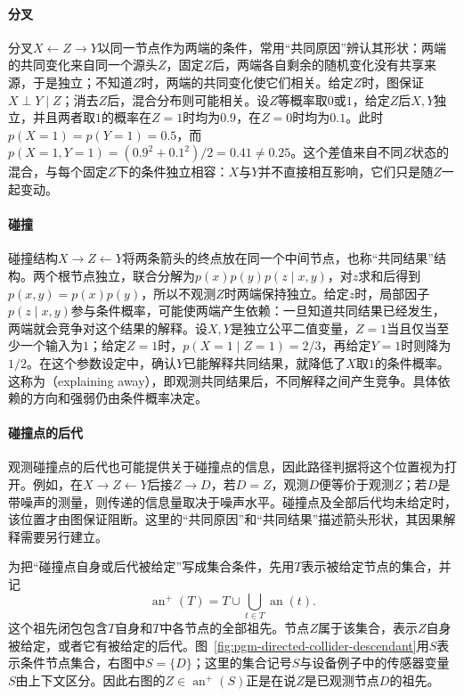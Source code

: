 \paragraph{分叉}
分叉$X\leftarrow Z\to Y$以同一节点作为两端的条件，常用“共同原因”辨认其形状：两端的共同变化来自同一个源头$Z$，固定$Z$后，两端各自剩余的随机变化没有共享来源，于是独立；不知道$Z$时，两端的共同变化使它们相关。给定$Z$时，图保证$X\perp Y\mid Z$；消去$Z$后，混合分布则可能相关。设$Z$等概率取$0$或$1$，给定$Z$后$X,Y$独立，并且两者取$1$的概率在$Z=1$时均为$0.9$，在$Z=0$时均为$0.1$。此时$p(X=1)=p(Y=1)=0.5$，而$p(X=1,Y=1)=(0.9^2+0.1^2)/2=0.41\ne0.25$。这个差值来自不同$Z$状态的混合，与每个固定$Z$下的条件独立相容：$X$与$Y$并不直接相互影响，它们只是随$Z$一起变动。

\paragraph{碰撞}
碰撞结构$X\to Z\leftarrow Y$将两条箭头的终点放在同一个中间节点，也称“共同结果”结构。两个根节点独立，联合分解为$p(x)p(y)p(z\mid x,y)$，对$z$求和后得到$p(x,y)=p(x)p(y)$，所以不观测$Z$时两端保持独立。给定$z$时，局部因子$p(z\mid x,y)$参与条件概率，可能使两端产生依赖：一旦知道共同结果已经发生，两端就会竞争对这个结果的解释。设$X,Y$是独立公平二值变量，$Z=1$当且仅当至少一个输入为$1$；给定$Z=1$时，$p(X=1\mid Z=1)=2/3$，再给定$Y=1$时则降为$1/2$。在这个参数设定中，确认$Y$已能解释共同结果，就降低了$X$取$1$的条件概率。这称为（explaining away），即观测共同结果后，不同解释之间产生竞争。具体依赖的方向和强弱仍由条件概率决定。

\paragraph{碰撞点的后代}
观测碰撞点的后代也可能提供关于碰撞点的信息，因此路径判据将这个位置视为打开。例如，在$X\to Z\leftarrow Y$后接$Z\to D$，若$D=Z$，观测$D$便等价于观测$Z$；若$D$是带噪声的测量，则传递的信息量取决于噪声水平。碰撞点及全部后代均未给定时，该位置才由图保证阻断。这里的“共同原因”和“共同结果”描述箭头形状，其因果解释需要另行建立。

为把“碰撞点自身或后代被给定”写成集合条件，先用$T$表示被给定节点的集合，并记
\[
  \operatorname{an}^{+}(T)
    =T\cup\bigcup_{t\in T}\operatorname{an}(t).
\]
这个祖先闭包包含$T$自身和$T$中各节点的全部祖先。节点$Z$属于该集合，表示$Z$自身被给定，或者它有被给定的后代。图~\ref{fig:pgm-directed-collider-descendant}用$S$表示条件节点集合，右图中$S=\{D\}$；这里的集合记号$S$与设备例子中的传感器变量$S$由上下文区分。因此右图的$Z\in\operatorname{an}^{+}(S)$正是在说$Z$是已观测节点$D$的祖先。

